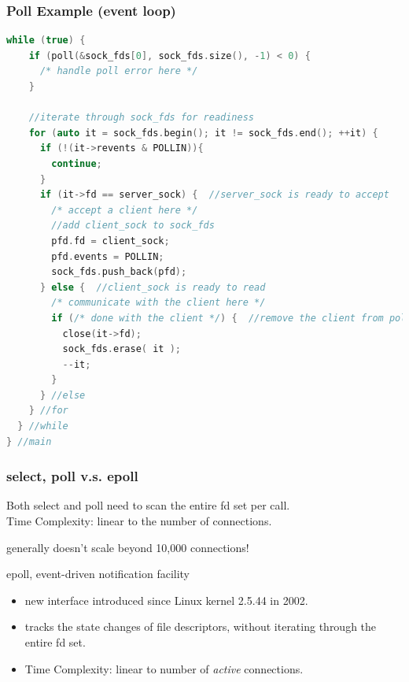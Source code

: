 \documentclass[aspectratio=43]{beamer}
\begin{document}
\begin{frame}[fragile]
  \frametitle{Poll Example (event loop)}
\begin{lstlisting}[language=C++,basicstyle=\ttfamily\tiny,commentstyle=\color{commgreen},keywordstyle=\color{blue},breaklines=true]
  while (true) {  
    if (poll(&sock_fds[0], sock_fds.size(), -1) < 0) {
      /* handle poll error here */
    }
    
    //iterate through sock_fds for readiness
    for (auto it = sock_fds.begin(); it != sock_fds.end(); ++it) {            
      if (!(it->revents & POLLIN)){
        continue;
      }
      if (it->fd == server_sock) {  //server_sock is ready to accept
        /* accept a client here */           
        //add client_sock to sock_fds
        pfd.fd = client_sock;
        pfd.events = POLLIN;
        sock_fds.push_back(pfd);
      } else {  //client_sock is ready to read
        /* communicate with the client here */
        if (/* done with the client */) {  //remove the client from poll queue
          close(it->fd);
          sock_fds.erase( it );
          --it;
        }
      } //else
    } //for
  } //while
} //main
\end{lstlisting}
\end{frame}

\begin{frame}[fragile]
  \frametitle{select, poll v.s. epoll}
  
     Both select and poll need to scan the entire fd set per call.\\
     Time Complexity: linear to the number of connections.\\
     \begin{center}
     \large generally doesn't scale beyond 10,000 connections!
     \end{center}
     
     epoll, event-driven notification facility
     \begin{itemize}
     \item new interface introduced since Linux kernel 2.5.44 in 2002.
     \item tracks the state changes of file descriptors, without iterating through the entire fd set.
     \item Time Complexity: linear to number of \emph{active} connections.
     \end{itemize}
\end{frame}
\end{document}
